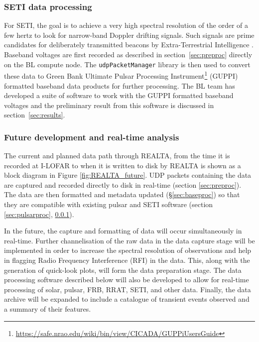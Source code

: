 \subsubsection{SETI data processing}
\label{sect:pipeline_SETI}
For SETI, the goal is to achieve a very high spectral resolution of the order of a few hertz to look for narrow-band Doppler drifting signals. Such signals are prime candidates for deliberately transmitted beacons by Extra-Terrestrial Intelligence \citep[ETI;][]{Tarter2001}. Baseband voltages are first recorded as described in section~\ref{sec:preproc} directly on the BL compute node. The \texttt{udpPacketManager} library is then used to convert these data to Green Bank Ultimate Pulsar Processing Instrument\footnote{\hyperref[GUPPI]{https://safe.nrao.edu/wiki/bin/view/CICADA/GUPPiUsersGuide}} (GUPPI) formatted baseband data products for further processing. The BL team has developed a suite of software to work with the GUPPI formatted baseband voltages \citep{Lebofsky2019} and the preliminary result from this software is discussed in section~\ref{sec:results}. 

\subsubsection{Future development and real-time analysis}
\label{sec:future_software}
The current and planned data path through REALTA, from the time it is recorded at I-LOFAR to when it is written to disk by REALTA is shown as a block diagram in Figure \ref{fig:REALTA_future}. UDP packets containing the data are captured and recorded directly to disk in real-time (section \ref{sec:preproc}). The data are then formatted and metadata updated (\S \ref{sec:baseproc}) so that they are compatible with existing pulsar and SETI software (section \ref{sec:pulsarproc}, \ref{sect:pipeline_SETI}).

In the future, the capture and formatting of data will occur simultaneously in real-time. Further channelisation of the raw data in the data capture stage will be implemented in order to increase the spectral resolution of observations and help in flagging Radio Frequency Interference (RFI) in the data. This, along with the generation of quick-look plots, will form the data preparation stage. The data processing software described below will also be developed to allow for real-time processing of solar, pulsar, FRB, RRAT, SETI, and other data. Finally, the data archive will be expanded to include a catalogue of transient events observed and a summary of their features.

